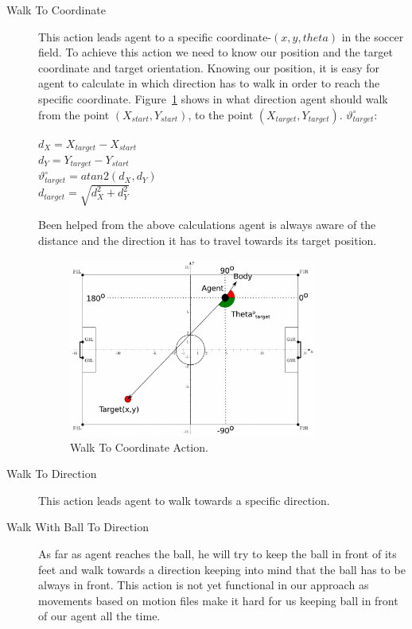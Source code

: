 \begin{description}
 \item[Walk To Coordinate]
 This action leads agent to a specific coordinate-$(x, y, theta)$ in the soccer field. To achieve this action we need to know our position and the target coordinate and target orientation. Knowing our position, it is easy for agent to calculate in which direction has to walk in order to reach the specific coordinate. Figure~\ref{fig:WalkToCoordinate} shows in what direction agent should walk from the point $(X_{start},Y_{start})$, to the point $(X_{target},Y_{target})$. $\vartheta_{target}^{\circ}$:\\
\begin{center}
$d_{X} = X_{target} - X_{start}$\\
$d_{Y} = Y_{target} - Y_{start}$\\
$\vartheta_{target}^{\circ} = atan2(d_{X},d_{Y})$\\
$d_{target} = \sqrt{d_{X}^2 + d_{Y}^2}$
\end{center}
Been helped from the above calculations agent is always aware of the distance and the direction it has to travel towards its target position. 


 \begin{figure}[t!]
\centering
  \includegraphics[width=0.8\textwidth]{Chapter3/figures/GoToPos.pdf}
  \caption{Walk To Coordinate Action.}
  \label{fig:WalkToCoordinate}
\end{figure}


 \item[Walk To Direction]
 This action leads agent to walk towards a specific direction.
 
 \item[Walk With Ball To Direction]
 As far as agent reaches the ball, he will try to keep the ball in front of its feet and walk towards a direction keeping into mind that the ball has to be always in front. This action is not yet functional in our approach as movements based on motion files make it hard for us keeping ball in front of our agent all the time.
 
\end{description}


